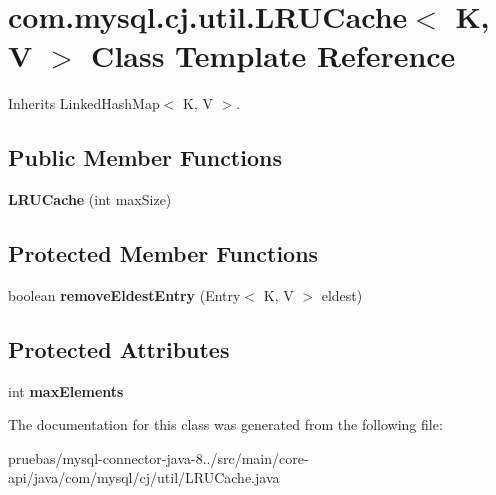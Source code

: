 \hypertarget{classcom_1_1mysql_1_1cj_1_1util_1_1_l_r_u_cache}{}\section{com.\+mysql.\+cj.\+util.\+L\+R\+U\+Cache$<$ K, V $>$ Class Template Reference}
\label{classcom_1_1mysql_1_1cj_1_1util_1_1_l_r_u_cache}


Inherits Linked\+Hash\+Map$<$ K, V $>$.

\subsection*{Public Member Functions}
\begin{DoxyCompactItemize}
\item 
\mbox{\label{classcom_1_1mysql_1_1cj_1_1util_1_1_l_r_u_cache_a5ecb8fc6166af1e20a5e67f8505f5702}} 
{\bfseries L\+R\+U\+Cache} (int max\+Size)
\end{DoxyCompactItemize}
\subsection*{Protected Member Functions}
\begin{DoxyCompactItemize}
\item 
\mbox{\label{classcom_1_1mysql_1_1cj_1_1util_1_1_l_r_u_cache_a661aa5aa8a43ec36c8bbb23f224ed392}} 
boolean {\bfseries remove\+Eldest\+Entry} (Entry$<$ K, V $>$ eldest)
\end{DoxyCompactItemize}
\subsection*{Protected Attributes}
\begin{DoxyCompactItemize}
\item 
\mbox{\label{classcom_1_1mysql_1_1cj_1_1util_1_1_l_r_u_cache_a6e6ca813624fbaffd4f734b48e10e7e9}} 
int {\bfseries max\+Elements}
\end{DoxyCompactItemize}


The documentation for this class was generated from the following file\+:\begin{DoxyCompactItemize}
\item 
pruebas/mysql-\/connector-\/java-\/8../src/main/core-\/api/java/com/mysql/cj/util/L\+R\+U\+Cache.\+java\end{DoxyCompactItemize}
